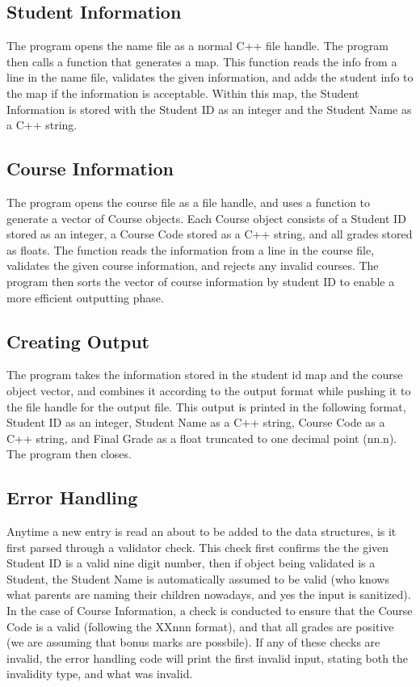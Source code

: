 \documentclass{article}
\begin{document}
\subsection{Student Information}
The program opens the name file as a normal C++ file handle. The program then calls a function that generates a map. This function reads the info from a line in the name file, validates the given information, and adds the student info to the map if the information is acceptable. Within this map, the Student Information is stored with the Student ID as an integer and the Student Name as a C++ string.

\subsection{Course Information}
The program opens the course file as a file handle, and uses a function to generate a vector of Course objects. Each Course object consists of a Student ID stored as an integer, a Course Code stored as a C++ string, and all grades stored as floats. The function reads the information from a line in the course file, validates the given course information, and rejects any invalid courses. The program then sorts the vector of course information by student ID to enable a more efficient outputting phase.

\subsection{Creating Output}
The program takes the information stored in the student id map and the course object vector, and combines it according to the output format while pushing it to the file handle for the output file. This output is printed in the following format, Student ID as an integer, Student Name as a C++ string, Course Code as a C++ string, and Final Grade as a float truncated to one decimal point (nn.n). The program then closes.

\subsection{Error Handling}
Anytime a new entry is read an about to be added to the data structures, is it first parsed through a validator check. This check first confirms the the given Student ID is a valid nine digit number, then if object being validated is a Student, the Student Name is automatically assumed to be valid (who knows what parents are naming their children nowadays, and yes the input is sanitized). In the case of Course Information, a check is conducted to ensure that the Course Code is a valid (following the XXnnn format), and that all grades are positive (we are assuming that bonus marks are possbile). If any of these checks are invalid, the error handling code will print the first invalid input, stating both the invalidity type, and what was invalid.
\end{document}
